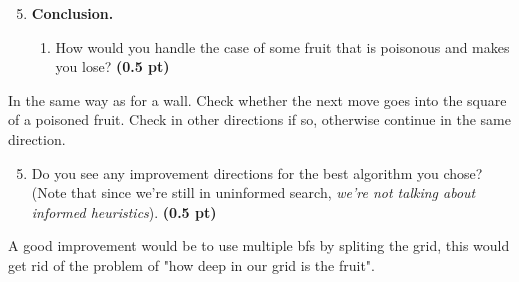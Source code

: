 \documentclass[11pt,a4paper]{../template/report}
\begin{document}
\begin{enumerate}
\setcounter{enumi}{4}
\item \textbf{Conclusion.}
\begin{enumerate}
        \item How would you handle the case of some fruit that is poisonous and makes
you lose?
\textbf{(0.5 pt)}
\end{enumerate}

\end{enumerate}

\begin{answer}
In the same way as for a wall. Check whether the next move goes into the square of a poisoned fruit. Check in other directions if so, otherwise continue in the same direction.
\end{answer}

\begin{enumerate}
\setcounter{enumi}{4}
\begin{enumerate}
\setcounter{enumii}{4}
        \item  Do you see any improvement directions for the best algorithm you chose? (Note that since we're still in uninformed search, \textit{we're not talking about informed heuristics}). \textbf{(0.5 pt)}
\end{enumerate}

\end{enumerate}

\begin{answer}
A good improvement would be to use multiple bfs by spliting the grid, this would get rid of the problem of "how deep in our grid is the fruit".
\end{answer}
\end{document}
